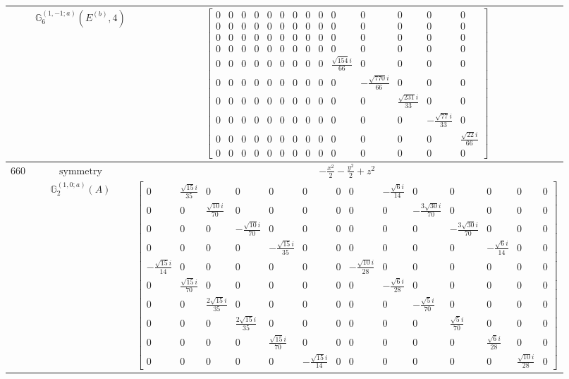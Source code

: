 \documentclass[fleqn,8pt,landscape]{jsarticle}
\begin{document}
\begin{longtable}{ccc}
$  $ & $ \mathbb{G}_{6}^{(1,-1;a)}(E^{(b)},4) $ & $ \begin{bmatrix} 0 & 0 & 0 & 0 & 0 & 0 & 0 & 0 & 0 & 0 & 0 & 0 & 0 & 0 \\ 0 & 0 & 0 & 0 & 0 & 0 & 0 & 0 & 0 & 0 & 0 & 0 & 0 & 0 \\ 0 & 0 & 0 & 0 & 0 & 0 & 0 & 0 & 0 & 0 & 0 & 0 & 0 & 0 \\ 0 & 0 & 0 & 0 & 0 & 0 & 0 & 0 & 0 & 0 & 0 & 0 & 0 & 0 \\ 0 & 0 & 0 & 0 & 0 & 0 & 0 & 0 & 0 & \frac{\sqrt{154} i}{66} & 0 & 0 & 0 & 0 \\ 0 & 0 & 0 & 0 & 0 & 0 & 0 & 0 & 0 & 0 & - \frac{\sqrt{770} i}{66} & 0 & 0 & 0 \\ 0 & 0 & 0 & 0 & 0 & 0 & 0 & 0 & 0 & 0 & 0 & \frac{\sqrt{231} i}{33} & 0 & 0 \\ 0 & 0 & 0 & 0 & 0 & 0 & 0 & 0 & 0 & 0 & 0 & 0 & - \frac{\sqrt{77} i}{33} & 0 \\ 0 & 0 & 0 & 0 & 0 & 0 & 0 & 0 & 0 & 0 & 0 & 0 & 0 & \frac{\sqrt{22} i}{66} \\ 0 & 0 & 0 & 0 & 0 & 0 & 0 & 0 & 0 & 0 & 0 & 0 & 0 & 0 \end{bmatrix} $ \\ \hline
$ 660 $ & $ \text{symmetry} $ & $ - \frac{x^{2}}{2} - \frac{y^{2}}{2} + z^{2} $ \\
$  $ & $ \mathbb{G}_{2}^{(1,0;a)}(A) $ & $ \begin{bmatrix} 0 & \frac{\sqrt{15} i}{35} & 0 & 0 & 0 & 0 & 0 & 0 & - \frac{\sqrt{6} i}{14} & 0 & 0 & 0 & 0 & 0 \\ 0 & 0 & \frac{\sqrt{10} i}{70} & 0 & 0 & 0 & 0 & 0 & 0 & - \frac{3 \sqrt{30} i}{70} & 0 & 0 & 0 & 0 \\ 0 & 0 & 0 & - \frac{\sqrt{10} i}{70} & 0 & 0 & 0 & 0 & 0 & 0 & - \frac{3 \sqrt{30} i}{70} & 0 & 0 & 0 \\ 0 & 0 & 0 & 0 & - \frac{\sqrt{15} i}{35} & 0 & 0 & 0 & 0 & 0 & 0 & - \frac{\sqrt{6} i}{14} & 0 & 0 \\ - \frac{\sqrt{15} i}{14} & 0 & 0 & 0 & 0 & 0 & 0 & - \frac{\sqrt{10} i}{28} & 0 & 0 & 0 & 0 & 0 & 0 \\ 0 & \frac{\sqrt{15} i}{70} & 0 & 0 & 0 & 0 & 0 & 0 & - \frac{\sqrt{6} i}{28} & 0 & 0 & 0 & 0 & 0 \\ 0 & 0 & \frac{2 \sqrt{15} i}{35} & 0 & 0 & 0 & 0 & 0 & 0 & - \frac{\sqrt{5} i}{70} & 0 & 0 & 0 & 0 \\ 0 & 0 & 0 & \frac{2 \sqrt{15} i}{35} & 0 & 0 & 0 & 0 & 0 & 0 & \frac{\sqrt{5} i}{70} & 0 & 0 & 0 \\ 0 & 0 & 0 & 0 & \frac{\sqrt{15} i}{70} & 0 & 0 & 0 & 0 & 0 & 0 & \frac{\sqrt{6} i}{28} & 0 & 0 \\ 0 & 0 & 0 & 0 & 0 & - \frac{\sqrt{15} i}{14} & 0 & 0 & 0 & 0 & 0 & 0 & \frac{\sqrt{10} i}{28} & 0 \end{bmatrix} $ \\ \hline

\end{longtable}
\end{document}
